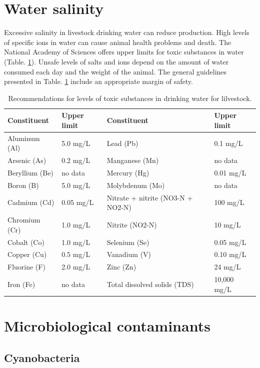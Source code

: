 \documentclass[]{book}
\begin{document}
\section{Water salinity}\label{water-salinity}

Excessive salinity in livestock drinking water can reduce production.
High levels of specific ions in water can cause animal health problems
and death. The National Academy of Sciences offers upper limits for
toxic substances in water (Table. \ref{tab:water-toxic}). Unsafe levels
of salts and ions depend on the amount of water consumed each day and
the weight of the animal. The general guidelines presented in Table.
\ref{tab:water-toxic} include an appropriate margin of safety.

\begin{table}[t]

\caption{\label{tab:water-toxic}Recommendations for levels of toxic substances in drinking water for lilvestock. }
\centering
\begin{tabular}{llll}
\toprule
Constituent & Upper limit & Constituent & Upper limit\\
\midrule
Aluminum (Al) & 5.0 mg/L & Lead (Pb) & 0.1 mg/L\\
Arsenic (As) & 0.2 mg/L & Manganese (Mn) & no data\\
Beryllium (Be) & no data & Mercury (Hg) & 0.01 mg/L\\
Boron (B) & 5.0 mg/L & Molybdenum (Mo) & no data\\
Cadmium (Cd) & 0.05 mg/L & Nitrate + nitrite (NO3-N + NO2-N) & 100 mg/L\\
\addlinespace
Chromium (Cr) & 1.0 mg/L & Nitrite (NO2-N) & 10 mg/L\\
Cobalt (Co) & 1.0 mg/L & Selenium (Se) & 0.05 mg/L\\
Copper (Cu) & 0.5 mg/L & Vanadium (V) & 0.10 mg/L\\
Fluorine (F) & 2.0 mg/L & Zinc (Zn) & 24 mg/L\\
Iron (Fe) & no data & Total dissolved solids (TDS) & 10,000 mg/L\\
\bottomrule
\end{tabular}
\end{table}

\section{Microbiological
contaminants}\label{microbiological-contaminants}

\subsection{Cyanobacteria}\label{cyanobacteria}
\end{document}
